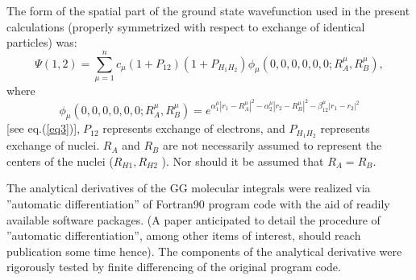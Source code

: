 The form of the spatial part of the ground state wavefunction used in the
present calculations (properly symmetrized with respect to exchange of
identical particles) was: 
\begin{equation}
\Psi (1,2)=\sum\limits_{\mu =1}^nc_\mu (1+P_{12})(1+P_{H_1H_2})\phi _\mu
(0,0,0,0,0,0;R_A^\mu ,R_B^\mu ),
\end{equation}
where 
\begin{equation}
\phi _\mu (0,0,0,0,0,0;R_A^\mu ,R_B^\mu )=e^{\alpha _1^\mu \left|
r_1-R_A^\mu \right| ^2-\alpha _2^\mu \left| r_2-R_B^\mu \right| ^2-\beta
_{12}^\mu \left| r_1-r_2\right| ^2}
\end{equation}
[see eq.(\ref{eq3})],$\;P_{12}$ represents exchange of electrons, and $%
P_{H_1H_2}$ represents exchange of nuclei. $R_A$ and $R_B$ are not
necessarily assumed to represent the centers of the nuclei ($R_{H1},R_{H2}$%
). Nor should it be assumed that $R_A=R_B$.

The analytical derivatives of the GG molecular integrals were realized via
''automatic differentiation'' of Fortran90 program code with the aid of
readily available software packages. (A paper anticipated to detail the
procedure of ''automatic differentiation'', among other items of interest,
should reach publication some time hence\cite{gilmore1}). The components of
the analytical derivative were rigorously tested by finite differencing of
the original program code.


